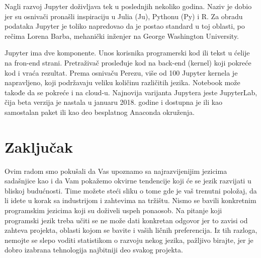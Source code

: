 \documentclass[a4paper]{article}
\begin{document}
Nagli razvoj Jupyter doživljava tek u poslednjih nekoliko godina. Naziv je dobio jer su osnivači pronašli inspiraciju u  Julia (Ju), Pythonu (Py) i R. Za obradu podataka Jupyter je toliko napredovao da je postao standard u toj oblasti, po rečima Lorena Barba, mehanički inženjer na George Washington University.

Jupyter ima dve komponente. Unos korisnika programerski kod ili tekst u ćelije na fron-end strani. Pretraživač prosleđuje kod na back-end (kernel) koji pokreće kod i vraća rezultat. Prema osnivaču Perezu, više od 100 Jupyter kernela je napravljeno, koji podržavaju veliku količinu različitih jezika. Notebook može takođe da se pokreće i na cloud-u. Najnovija varijanta Jupytera jeste JupyterLab, čija beta verzija je nastala u januaru 2018. godine i dostupna je ili kao samostalan paket ili kao deo besplatnog Anaconda okruženja.

\section{Zaključak}
\label{sec:zakljucak}

Ovim radom smo pokušali da Vas upoznamo sa najrazvijenijim jezicima sadašnjice kao i da Vam pokažemo okvirne tendencije koji će se jezik razvijati u bliskoj budućnosti. Time možete steći sliku o tome gde je vaš trenutni položaj, da li idete u korak sa industrijom i zahtevima na tržištu. Nismo se bavili konkretnim programskim jezicima koji su doživeli uspeh ponaosob. Na pitanje koji programski jezik treba učiti se ne može dati konkretan odgovor jer to zavisi od zahteva projekta, oblasti kojom se bavite i vaših ličnih preferencija. Iz tih razloga, nemojte se slepo voditi statistikom o razvoju nekog jezika, pažljivo birajte, jer je dobro izabrana tehnologija najbitniji deo svakog projekta.

\appendix



\end{document}
